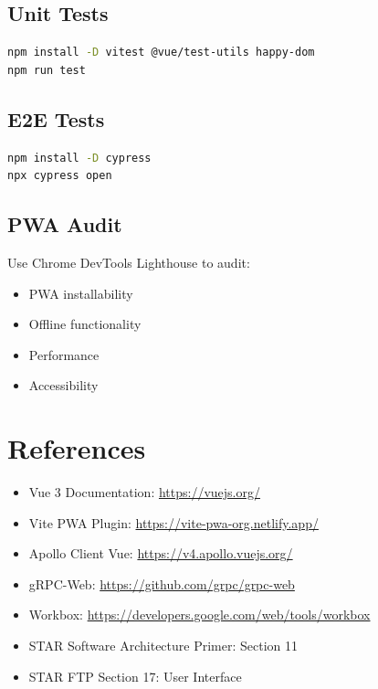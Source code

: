 \subsection{Unit Tests}

\begin{lstlisting}[language=bash]
npm install -D vitest @vue/test-utils happy-dom
npm run test
\end{lstlisting}

\subsection{E2E Tests}

\begin{lstlisting}[language=bash]
npm install -D cypress
npx cypress open
\end{lstlisting}

\subsection{PWA Audit}

Use Chrome DevTools Lighthouse to audit:
\begin{itemize}
    \item PWA installability
    \item Offline functionality
    \item Performance
    \item Accessibility
\end{itemize}

\section{References}

\begin{itemize}
    \item Vue 3 Documentation: \url{https://vuejs.org/}
    \item Vite PWA Plugin: \url{https://vite-pwa-org.netlify.app/}
    \item Apollo Client Vue: \url{https://v4.apollo.vuejs.org/}
    \item gRPC-Web: \url{https://github.com/grpc/grpc-web}
    \item Workbox: \url{https://developers.google.com/web/tools/workbox}
    \item STAR Software Architecture Primer: Section 11
    \item STAR FTP Section 17: User Interface
\end{itemize}

